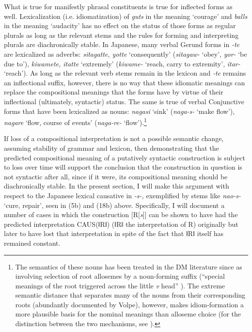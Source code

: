 \documentclass[output=paper,
modfonts
]{LSP/langsci}
\begin{document}
What is true for manifestly phrasal constituents is true for inflected
forms as well. Lexicalization (i.e. idiomatization) of \textit{guts} in
the meaning `courage' and \textit{balls} in the meaning `audacity' has no
effect on the status of those forms as regular plurals as long as the
relevant stems and the rules for forming and interpreting plurals are
diachronically stable. In Japanese, many verbal Gerund forms in
\textit{\nobreakdash-te} are lexicalized as adverbs: \textit{sitagatte, yotte}
`consequently' (\textit{sitagaw-} `obey', \textit{yor-} `be due to'),
\textit{kiwamete, itatte} `extremely' (\textit{kiwame-} `reach, carry to
extremity', \textit{itar-} `reach'). As long as the relevant verb stems
remain in the lexicon and \textit{-te} remains an inflectional suffix,
however, there is no way that these idiomatic meanings can replace the
compositional meanings that the forms have by virtue of their
inflectional (ultimately, syntactic) status. The same is true of verbal
Conjunctive forms that have been lexicalized as nouns: \textit{nagasi}
`sink' (\textit{naga-s-} `make flow'), \textit{nagare} `flow, course of
events' (\textit{naga-re-} `flow').\footnote{The semantics of these nouns
  has been treated in the DM literature since \citet{volpe2005a} as involving
  selection of root allosemes by a noun-forming suffix (``special
  meanings of the root triggered across the little \textit{v} head'' \citep[107]{marantz2013a}). The extreme semantic distance that separates many of the nouns from their corresponding roots (abundantly documented by
  Volpe), however, makes idiom-formation a more plausible basis for the
  nominal meanings than alloseme choice (for the distinction between the
  two mechanisms, see \citealt[105]{marantz2013a}).}

If loss of a compositional interpretation is not a possible semantic
change, assuming stability of grammar and lexicon, then demonstrating
that the predicted compositional meaning of a putatively syntactic
construction is subject to loss over time will support the conclusion
that the construction in question is not syntactic after all, since if
it were, its compositional meaning should be diachronically stable. In
the present section, I will make this argument with respect to the
Japanese lexical causative in \textit{-s-,} exemplified by stems like
\textit{nao-s-} `cure, repair', seen in (5b) and (18b) above.
Specifically, I will document a number of cases in which the
construction {[}R{[}\textit{s}{]}{]} can be shown to have had the predicted
interpretation CAUS(ǁRǁ) (ǁRǁ the interpretation of R) originally but
later to have lost that interpretation in spite of the fact that ǁRǁ
itself has remained constant.
\end{document}

